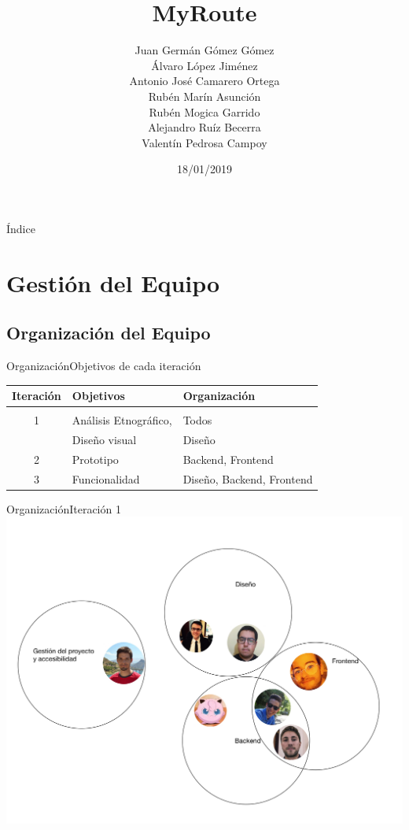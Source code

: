 \documentclass{beamer}
\title{MyRoute}
\subtitle { \vspace{1cm} \color{black}Juan Germ\'an G\'omez G\'omez \\ \'Alvaro L\'opez Jim\'enez \\ Antonio Jos\'e Camarero Ortega \\ Rub\'en Mar\'in Asunci\'on \\ Rub\'en Mogica Garrido \\ Alejandro Ru\'iz Becerra \\ Valent\'in Pedrosa Campoy}
\date{18/01/2019}
\begin{document}
\begin{frame}
  \titlepage 
\end{frame}

\begin{frame}{\'Indice}
  \tiny 
  \tableofcontents
\end{frame}

\section{Gesti\'on del Equipo}

\subsection{Organizaci\'on del Equipo}

\begin{frame}{Organizaci\'on}{Objetivos de cada iteraci\'on}
  \begin{tabular}{cll}
  Iteraci\'on  & Objetivos & Organizaci\'on \\\hline \\
  1  &  An\'alisis Etnogr\'afico,  & Todos \\
     &  Dise\~no visual            & Dise\~no\\[0.3cm]
  2  &  Prototipo  & Backend, Frontend \\[0.3cm]
  3  &  Funcionalidad & Dise\~no, Backend, Frontend
  \end{tabular}
\end{frame}


\begin{frame}{Organizaci\'on}{Iteraci\'on 1}
\includegraphics[scale=0.1]{images_latex/org_itr1}
\end{frame}
\end{document}

